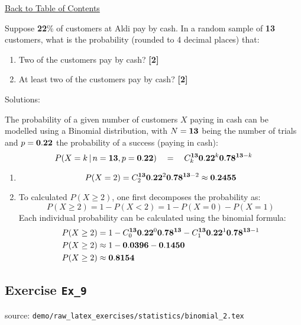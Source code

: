 \documentclass[a4paper, leqno, 12pt]{report}
\newenvironment{top_enumerate}{
\begin{enumerate}
  \setlength{\itemsep}{2em}
  \setlength{\topsep}{-0pt}
  \setlength{\partopsep}{-0pt}
}{\end{enumerate}}
\begin{document}
\hyperlink{contents}{Back to Table of Contents}
\begin{top_enumerate}
\item Suppose {\bf 22}\% of customers at Aldi pay by cash. In a random sample of {\bf 13} customers, what is the probability (rounded to 4 decimal places) that:
 
\setcounter{equation}{0}  %
\begin{enumerate}
	\setlength{\topsep}{-0pt}
	\setlength{\partopsep}{-0pt}
	\setlength{\itemsep}{10pt}
			\item Two of the customers pay by cash?
	 \quad \textbf{[2]}
		\item At least two of the customers pay by cash?
	 \quad \textbf{[2]}
\end{enumerate}\addtocounter{enumi}{-1}
\item Solutions:

The probability of a given number of customers $X$ paying in cash can be modelled using a Binomial distribution, with $N={\bf 13}$ being the number of trials and $p={\bf 0.22}$ the probability of a success (paying in cash):
\[
P(X=k \, | \, n={\bf 13},p={\bf 0.22}) \quad = \quad C^{{\bf 13}}_k {\bf 0.22}^k {\bf 0.78}^{{\bf 13}-k}
\]
 
\setcounter{equation}{0}  %
\begin{enumerate}
	\setlength{\topsep}{-0pt}
	\setlength{\partopsep}{-0pt}
	\setlength{\itemsep}{10pt}
			\item \[
	P(X = 2)  = C^{{\bf 13}}_2 {\bf 0.22}^2 {\bf 0.78}^{{\bf 13}-2} \approx {\bf 0.2455}
	\]
	 \quad \textbf{}
		\item To calculated $P(X \ge 2)$, one first decomposes the probability as:
	\[
	P(X \ge 2) = 1 - P(X<2) = 1 - P(X=0) - P(X=1)
	\]
	Each individual probability can be calculated using the binomial formula:
	\[
	\begin{aligned}
	P(X \ge 2) &= 1 - C^{{\bf 13}}_0 {\bf 0.22}^0 {\bf 0.78}^{{\bf 13}} - C^{{\bf 13}}_1 {\bf 0.22}^1 {\bf 0.78}^{{\bf 13}-1}\\
	P(X \ge 2) &\approx 1 - {\bf 0.0396} - {\bf 0.1450} \\
	P(X \ge 2) &\approx {\bf 0.8154} \\
	\end{aligned}
	\]
	 \quad \textbf{}
\end{enumerate}\newpage
\end{top_enumerate}
\subsection{Exercise \texttt{Ex\_9}}
source: \texttt{demo/raw\_latex\_exercises/statistics/binomial\_2.tex}
\end{document}

